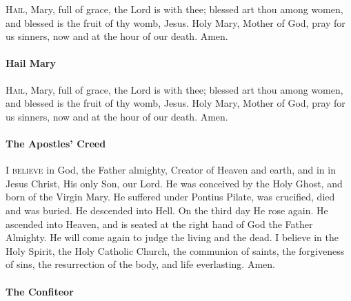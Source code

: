 \documentclass{article}
\begin{document}
\begin{multicols}{3}
\textsc{Hail}, Mary, full of grace, the Lord is with thee;
blessed art thou among women, and blessed is the fruit of
thy womb, Jesus.  Holy Mary, Mother of God, pray for us sinners,
now and at the hour of our death. Amen.

\paragraph{Hail Mary}

\textsc{Hail}, Mary, full of grace, the Lord is with thee;
blessed art thou among women, and blessed is the fruit of
thy womb, Jesus.  Holy Mary, Mother of God, pray for us sinners,
now and at the hour of our death. Amen.

\paragraph{The Apostles' Creed}

\textsc{I believe} in God, the Father almighty, Creator of Heaven and earth,
and in in Jesus Christ, His only Son, our Lord. He was conceived by
the Holy Ghost, and born of the Virgin Mary. He suffered under Pontius
Pilate, was crucified, died and was buried. He descended into Hell.
On the third day He rose again. He ascended into Heaven, and is seated
at the right hand of God the Father Almighty. He will come again to
judge the living and the dead. I believe in the Holy Spirit, the Holy
Catholic Church, the communion of saints, the forgiveness of sins, the
resurrection of the body, and life everlasting. Amen. 

\paragraph{The Confiteor}

\end{multicols}
\end{document}
